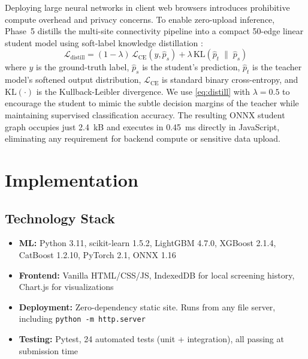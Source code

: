 \documentclass[conference]{IEEEtran}
\begin{document}
Deploying large neural networks in client web browsers introduces prohibitive compute overhead and privacy concerns. To enable zero-upload inference, Phase~5 distills the multi-site connectivity pipeline into a compact 50-edge linear student model using soft-label knowledge distillation \cite{abnar2020}:
\begin{equation}
  \mathcal{L}_{\text{distill}} =
  (1 - \lambda)\,\mathcal{L}_{\text{CE}}(y, \hat{p}_s) +
  \lambda\,\text{KL}\!\left(\hat{p}_t \;\|\; \hat{p}_s\right)
  \label{eq:distill}
\end{equation}
where $y$ is the ground-truth label, $\hat{p}_s$ is the student's prediction, $\hat{p}_t$ is the teacher model's softened output distribution, $\mathcal{L}_{\text{CE}}$ is standard binary cross-entropy, and $\text{KL}(\cdot)$ is the Kullback-Leibler divergence. We use \eqref{eq:distill} with $\lambda = 0.5$ to encourage the student to mimic the subtle decision margins of the teacher while maintaining supervised classification accuracy. The resulting ONNX student graph occupies just 2.4~kB and executes in 0.45~ms directly in JavaScript, eliminating any requirement for backend compute or sensitive data upload.

\section{Implementation}

\subsection{Technology Stack}

\begin{itemize}
  \item \textbf{ML:} Python 3.11, scikit-learn 1.5.2, LightGBM 4.7.0,
        XGBoost 2.1.4, CatBoost 1.2.10, PyTorch 2.1, ONNX 1.16
  \item \textbf{Frontend:} Vanilla HTML/CSS/JS, IndexedDB for local
        screening history, Chart.js for visualizations
  \item \textbf{Deployment:} Zero-dependency static site. Runs from any
        file server, including \texttt{python -m http.server}
  \item \textbf{Testing:} Pytest, 24 automated tests (unit +
        integration), all passing at submission time
\end{itemize}
\end{document}
